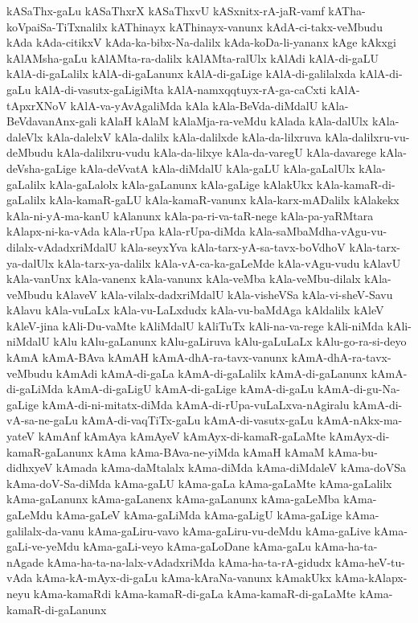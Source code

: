 {kASaThx-gaLu
kASaThxrX
kASaThxvU
kASxnitx-rA-jaR-vamf
kATha-koVpaiSa-TiTxnalilx
kAThinayx
kAThinayx-vanunx
kAdA-ci-takx-veMbudu
kAda
kAda-citikxV
kAda-ka-bibx-Na-dalilx
kAda-koDa-li-yananx
kAge
kAkxgi
kAlAMsha-gaLu
kAlAMta-ra-dalilx
kAlAMta-ralUlx
kAlAdi
kAlA-di-gaLU
kAlA-di-gaLalilx
kAlA-di-gaLanunx
kAlA-di-gaLige
kAlA-di-galilalxda
kAlA-di-gaLu
kAlA-di-vasutx-gaLigiMta
kAlA-namxqqtuyx-rA-ga-caCxti
kAlA-tApxrXNoV
kAlA-va-yAvAgaliMda
kAla
kAla-BeVda-diMdalU
kAla-BeVdavanAnx-gali
kAlaH
kAlaM
kAlaMja-ra-veMdu
kAlada
kAla-dalUlx
kAla-daleVlx
kAla-dalelxV
kAla-dalilx
kAla-dalilxde
kAla-da-lilxruva
kAla-dalilxru-vu-deMbudu
kAla-dalilxru-vudu
kAla-da-lilxye
kAla-da-varegU
kAla-davarege
kAla-deVsha-gaLige
kAla-deVvatA
kAla-diMdalU
kAla-gaLU
kAla-gaLalUlx
kAla-gaLalilx
kAla-gaLalolx
kAla-gaLanunx
kAla-gaLige
kAlakUkx
kAla-kamaR-di-gaLalilx
kAla-kamaR-gaLU
kAla-kamaR-vanunx
kAla-karx-mADalilx
kAlakekx
kAla-ni-yA-ma-kanU
kAlanunx
kAla-pa-ri-va-taR-nege
kAla-pa-yaRMtara
kAlapx-ni-ka-vAda
kAla-rUpa
kAla-rUpa-diMda
kAla-saMbaMdha-vAgu-vu-dilalx-vAdadxriMdalU
kAla-seyxYva
kAla-tarx-yA-sa-tavx-boVdhoV
kAla-tarx-ya-dalUlx
kAla-tarx-ya-dalilx
kAla-vA-ca-ka-gaLeMde
kAla-vAgu-vudu
kAlavU
kAla-vanUnx
kAla-vanenx
kAla-vanunx
kAla-veMba
kAla-veMbu-dilalx
kAla-veMbudu
kAlaveV
kAla-vilalx-dadxriMdalU
kAla-visheVSa
kAla-vi-sheV-Savu
kAlavu
kAla-vuLaLx
kAla-vu-LaLxdudx
kAla-vu-baMdAga
kAldalilx
kAleV
kAleV-jina
kAli-Du-vaMte
kAliMdalU
kAliTuTx
kAli-na-va-rege
kAli-niMda
kAli-niMdalU
kAlu
kAlu-gaLanunx
kAlu-gaLiruva
kAlu-gaLuLaLx
kAlu-go-ra-si-deyo
kAmA
kAmA-BAva
kAmAH
kAmA-dhA-ra-tavx-vanunx
kAmA-dhA-ra-tavx-veMbudu
kAmAdi
kAmA-di-gaLa
kAmA-di-gaLalilx
kAmA-di-gaLanunx
kAmA-di-gaLiMda
kAmA-di-gaLigU
kAmA-di-gaLige
kAmA-di-gaLu
kAmA-di-gu-Na-gaLige
kAmA-di-ni-mitatx-diMda
kAmA-di-rUpa-vuLaLxva-nAgiralu
kAmA-di-vA-sa-ne-gaLu
kAmA-di-vaqTiTx-gaLu
kAmA-di-vasutx-gaLu
kAmA-nAkx-ma-yateV
kAmAnf
kAmAya
kAmAyeV
kAmAyx-di-kamaR-gaLaMte
kAmAyx-di-kamaR-gaLanunx
kAma
kAma-BAva-ne-yiMda
kAmaH
kAmaM
kAma-bu-didhxyeV
kAmada
kAma-daMtalalx
kAma-diMda
kAma-diMdaleV
kAma-doVSa
kAma-doV-Sa-diMda
kAma-gaLU
kAma-gaLa
kAma-gaLaMte
kAma-gaLalilx
kAma-gaLanunx
kAma-gaLanenx
kAma-gaLanunx
kAma-gaLeMba
kAma-gaLeMdu
kAma-gaLeV
kAma-gaLiMda
kAma-gaLigU
kAma-gaLige
kAma-galilalx-da-vanu
kAma-gaLiru-vavo
kAma-gaLiru-vu-deMdu
kAma-gaLive
kAma-gaLi-ve-yeMdu
kAma-gaLi-veyo
kAma-gaLoDane
kAma-gaLu
kAma-ha-ta-nAgade
kAma-ha-ta-na-lalx-vAdadxriMda
kAma-ha-ta-rA-gidudx
kAma-heV-tu-vAda
kAma-kA-mAyx-di-gaLu
kAma-kAraNa-vanunx
kAmakUkx
kAma-kAlapx-neyu
kAma-kamaRdi
kAma-kamaR-di-gaLa
kAma-kamaR-di-gaLaMte
kAma-kamaR-di-gaLanunx
}
